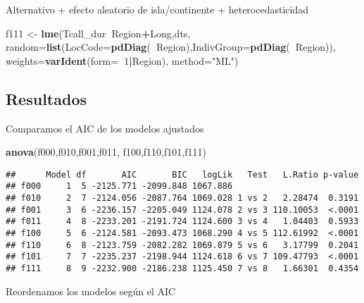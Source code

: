 \documentclass[]{article}
\newenvironment{Shaded}{\begin{snugshade}}{\end{snugshade}}
\newcommand{\DataTypeTok}[1]{\textcolor[rgb]{0.13,0.29,0.53}{#1}}
\newcommand{\DecValTok}[1]{\textcolor[rgb]{0.00,0.00,0.81}{#1}}
\newcommand{\KeywordTok}[1]{\textcolor[rgb]{0.13,0.29,0.53}{\textbf{#1}}}
\newcommand{\NormalTok}[1]{#1}
\newcommand{\OperatorTok}[1]{\textcolor[rgb]{0.81,0.36,0.00}{\textbf{#1}}}
\newcommand{\StringTok}[1]{\textcolor[rgb]{0.31,0.60,0.02}{#1}}
\begin{document}
Alternativo + efecto aleatorio de isla/continente + heterocedasticidad

\begin{Shaded}
\begin{Highlighting}[]
\NormalTok{f111 <-}
\StringTok{      }\KeywordTok{lme}\NormalTok{(Tcall_dur}\OperatorTok{~}\NormalTok{Region}\OperatorTok{+}\NormalTok{Long,dts,}
        \DataTypeTok{random=}\KeywordTok{list}\NormalTok{(}\DataTypeTok{LocCode=}\KeywordTok{pdDiag}\NormalTok{(}\OperatorTok{~}\NormalTok{Region),}\DataTypeTok{IndivGroup=}\KeywordTok{pdDiag}\NormalTok{(}\OperatorTok{~}\NormalTok{Region)),}
        \DataTypeTok{weights=}\KeywordTok{varIdent}\NormalTok{(}\DataTypeTok{form=}\OperatorTok{~}\DecValTok{1}\OperatorTok{|}\NormalTok{Region), }\DataTypeTok{method=}\StringTok{"ML"}\NormalTok{)}
\end{Highlighting}
\end{Shaded}

\hypertarget{resultados}{%
\subsection{Resultados}\label{resultados}}

Comparamos el AIC de los modelos ajustados

\begin{Shaded}
\begin{Highlighting}[]
\KeywordTok{anova}\NormalTok{(f000,f010,f001,f011,}
\NormalTok{  f100,f110,f101,f111)}
\end{Highlighting}
\end{Shaded}

\begin{verbatim}
##      Model df       AIC       BIC   logLik   Test   L.Ratio p-value
## f000     1  5 -2125.771 -2099.848 1067.886                         
## f010     2  7 -2124.056 -2087.764 1069.028 1 vs 2   2.28474  0.3191
## f001     3  6 -2236.157 -2205.049 1124.078 2 vs 3 110.10053  <.0001
## f011     4  8 -2233.201 -2191.724 1124.600 3 vs 4   1.04403  0.5933
## f100     5  6 -2124.581 -2093.473 1068.290 4 vs 5 112.61992  <.0001
## f110     6  8 -2123.759 -2082.282 1069.879 5 vs 6   3.17799  0.2041
## f101     7  7 -2235.237 -2198.944 1124.618 6 vs 7 109.47793  <.0001
## f111     8  9 -2232.900 -2186.238 1125.450 7 vs 8   1.66301  0.4354
\end{verbatim}

Reordenamos los modelos según el AIC

\begin{Shaded}
\end{Shaded}
\end{document}
